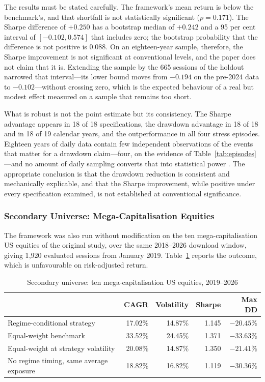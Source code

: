 The results must be stated carefully. The framework's mean return is below the
benchmark's, and that shortfall is not statistically significant ($p = 0.171$). The
Sharpe difference of $+0.250$ has a bootstrap median of $+0.242$ and a 95 per cent
interval of $[-0.102, 0.574]$ that includes zero; the bootstrap probability that the
difference is not positive is 0.088. On an eighteen-year sample, therefore, the Sharpe
improvement is not significant at conventional levels, and the paper does not claim that
it is. Extending the sample by the 665 sessions of the holdout narrowed that
interval---its lower bound moves from $-0.194$ on the pre-2024 data to $-0.102$---without
crossing zero, which is the expected behaviour of a real but modest effect measured on a
sample that remains too short.

What is robust is not the point estimate but its consistency. The Sharpe advantage
appears in 18 of 18 specifications, the drawdown advantage in 18 of 18 and in 18 of 19
calendar years, and the outperformance in all four stress episodes. Eighteen years of
daily data contain few independent observations of the events that matter for a drawdown
claim---four, on the evidence of Table~\ref{tab:episodes}---and no amount of daily
sampling converts that into statistical power \citep{harvey15}. The appropriate
conclusion is that the drawdown reduction is consistent and mechanically explicable, and
that the Sharpe improvement, while positive under every specification examined, is not
established at conventional significance.

\subsubsection{Secondary Universe: Mega-Capitalisation Equities}
\label{sec:megacap}

The framework was also run without modification on the ten mega-capitalisation US
equities of the original study, over the same 2018--2026 download window, giving 1{,}920
evaluated sessions from January 2019. Table~\ref{tab:megacap} reports the outcome, which
is unfavourable on risk-adjusted return.

\begin{table}[!ht]
\centering
\caption{Secondary universe: ten mega-capitalisation US equities, 2019--2026}
\label{tab:megacap}
\footnotesize
\begin{tabular}{p{4.8cm}rrrr}
\hline
& \textbf{CAGR} & \textbf{Volatility} & \textbf{Sharpe} & \textbf{Max DD} \\
\hline
Regime-conditional strategy & 17.02\% & 14.87\% & 1.145 & $-20.45$\% \\
Equal-weight benchmark & 33.52\% & 24.45\% & 1.371 & $-33.63$\% \\
Equal-weight at strategy volatility & 20.08\% & 14.87\% & 1.350 & $-21.41$\% \\
No regime timing, same average exposure & 18.82\% & 16.82\% & 1.119 & $-30.36$\% \\
\hline
\end{tabular}
\end{table}


